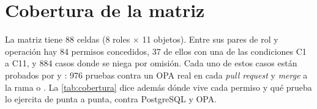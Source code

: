 \documentclass[11pt,a4paper]{article}
\theoremstyle{definition}
\theoremstyle{remark}
\begin{document}
%
%
\section{Cobertura de la matriz}
\label{sec:cobertura}

La matriz tiene 88 celdas (8 roles $\times$ 11 objetos). Entre sus pares de rol
y operaci\'on hay 84 permisos concedidos, 37 de ellos con una de las
condiciones C1 a C11, y 884 casos donde se niega por omisi\'on. Cada uno de estos casos est\'an
probados por  y : 976 pruebas
contra un OPA real en cada \emph{pull request} y \emph{merge} a la rama  o . La \cref{tab:cobertura} dice
adem\'as d\'onde vive cada permiso y qu\'e prueba lo ejercita de punta a punta,
contra PostgreSQL y OPA.
\end{document}
